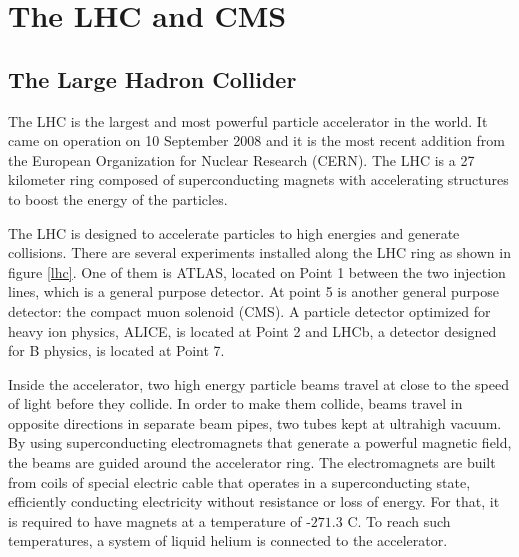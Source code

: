 
\chapter{The LHC and CMS}

\section{The Large Hadron Collider}

The LHC is the largest and most powerful particle accelerator in the world. It came on operation on 10 September 2008 and it is the most recent addition from the European Organization for Nuclear Research (CERN). The LHC is a 27 kilometer ring composed of superconducting magnets with accelerating structures to boost the energy of the particles. 

The LHC is designed to accelerate particles to high energies and generate collisions. There are several
experiments installed along the LHC ring as shown in figure \ref{lhc}. One of them is ATLAS, located on Point 1 between the two injection lines, which is a general purpose detector. At point 5 is another general purpose detector: the compact muon solenoid (CMS). A particle detector optimized for heavy ion physics, ALICE, is located at Point 2 and LHCb, a detector designed for B physics, is located at Point 7\cite{cern1,cern2}.


Inside the accelerator, two high energy particle beams travel at
close to the speed of light before they collide. 
In order to make them collide, beams travel in opposite directions in separate beam pipes, 
two tubes kept at ultrahigh vacuum. 
By using superconducting electromagnets that generate a powerful magnetic field, the beams are guided around the accelerator ring. 
The electromagnets are built from coils of special electric cable that operates in a superconducting state, efficiently conducting electricity without resistance or loss of energy. For that, it is required to have magnets at a temperature of $‑271.3$ C. 
To reach such temperatures, a system of liquid helium is connected to the accelerator\cite{cern2}.

\pagebreak


